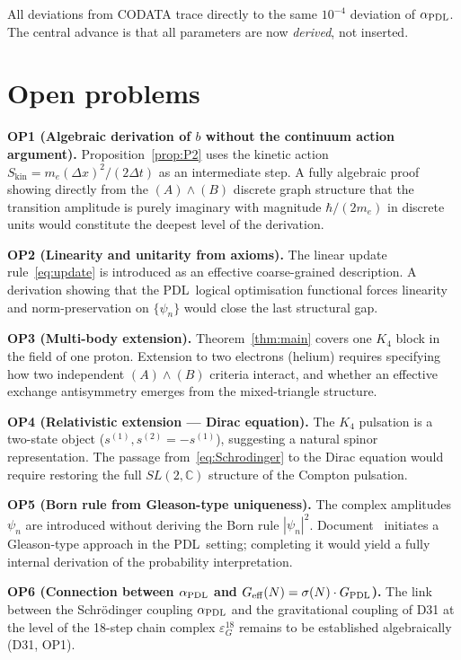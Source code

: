 \documentclass[11pt,a4paper]{article}
\theoremstyle{definition}
\newcommand{\PDL}{\textnormal{PDL}}
\newcommand{\hb}{\hbar}
\newcommand{\aPDL}{\alpha_{\PDL}}
\begin{document}
All deviations from CODATA trace directly to the same $10^{-4}$ deviation of $\aPDL$. The central advance is that all parameters are now \emph{derived}, not inserted.

\section{Open problems}
\label{sec:open}

\textbf{OP1 (Algebraic derivation of $b$ without the continuum action argument).} Proposition~\ref{prop:P2} uses the kinetic action $S_{\mathrm{kin}} = m_e(\Delta x)^2/(2\Delta t)$ as an intermediate step. A fully algebraic proof showing directly from the $(A)\wedge(B)$ discrete graph structure that the transition amplitude is purely imaginary with magnitude $\hb/(2m_e)$ in discrete units would constitute the deepest level of the derivation.

\textbf{OP2 (Linearity and unitarity from axioms).} The linear update rule~\eqref{eq:update} is introduced as an effective coarse-grained description. A derivation showing that the \PDL\ logical optimisation functional forces linearity and norm-preservation on $\{\psi_n\}$ would close the last structural gap.

\textbf{OP3 (Multi-body extension).} Theorem~\ref{thm:main} covers one $K_4$ block in the field of one proton. Extension to two electrons (helium) requires specifying how two independent $(A)\wedge(B)$ criteria interact, and whether an effective exchange antisymmetry emerges from the mixed-triangle structure.

\textbf{OP4 (Relativistic extension — Dirac equation).} The $K_4$ pulsation is a two-state object ($s^{(1)}, s^{(2)} = -s^{(1)}$), suggesting a natural spinor representation. The passage from~\eqref{eq:Schrodinger} to the Dirac equation would require restoring the full $SL(2,\mathbb{C})$ structure of the Compton pulsation.

\textbf{OP5 (Born rule from Gleason-type uniqueness).} The complex amplitudes $\psi_n$ are introduced without deriving the Born rule $|\psi_n|^2$. Document~\cite{Gleason_PDL_2026} initiates a Gleason-type approach in the \PDL\ setting; completing it would yield a fully internal derivation of the probability interpretation.

\textbf{OP6 (Connection between $\aPDL$ and $G_{\mathrm{eff}}(N) = \sigma(N)\cdot G_{\PDL}$).} The link between the Schr\"odinger coupling $\aPDL$ and the gravitational coupling of D31 at the level of the 18-step chain complex $\varepsilon_G^{18}$ remains to be established algebraically (D31, OP1).
\end{document}

